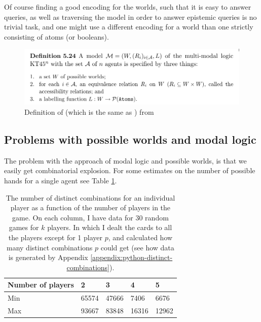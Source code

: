 Of course finding a good encoding for the worlds, such that it is easy to answer queries, as well as traversing the model in order to answer epistemic queries is no trivial task, and one might use a different encoding for a world than one strictly consisting of atoms (or booleans).






\begin{figure}
	\centering
\includegraphics[width=13cm,frame]{images/kt45n-definition.png}
	\caption{Definition of \KTfourfiveN (which is the same as \SfiveN{}) from \cite{HuthAndRyan2004KT45n}}
	\label{fig:kt45n-definition}
\end{figure}




\subsection{Problems with possible worlds and modal logic}
The problem with the approach of modal logic and possible worlds, is that we easily get combinatorial explosion. 
For some estimates on the number of possible hands for a single agent see Table \ref{table:combinations}.

\begin{table}
	\centering
\begin{tabular}{l|llll}
Number of players & 2       & 3       & 4       & 5      \\\hline
Min               & 65574   & 47666   & 7406    & 6676   \\
Max               & 93667   & 83848   & 16316   & 12962 
\end{tabular}
	\caption{The number of distinct combinations for an individual player as a function of the number of players in the game. 
	On each column, I have data for 30 random games for $k$ players. 
	In which I dealt the cards to all the players except for 1 player $p$, and calculated how many distinct combinations $p$ could get (see how data is generated by Appendix \ref{appendix:python-distinct-combinations}).}
	\label{table:combinations}
\end{table}



